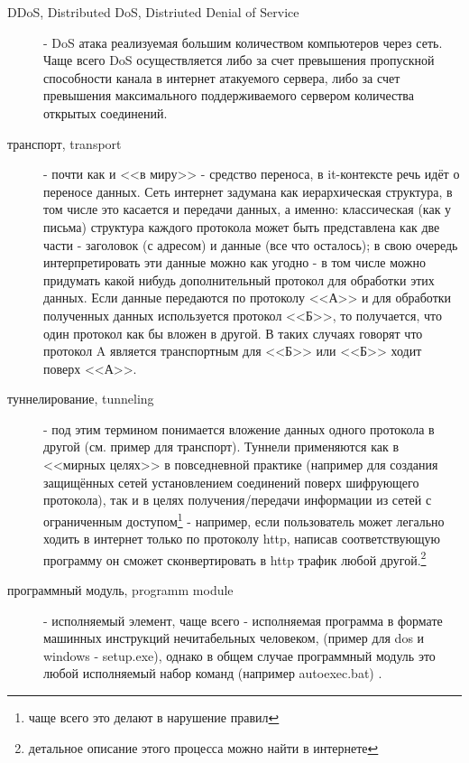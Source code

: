 \begin{description}
\item[DDoS, Distributed DoS, Distriuted Denial of Service]
 - DoS атака реализуемая
большим количеством
компьютеров через сеть. Чаще всего DoS осуществляется либо за счет превышения пропускной
способности канала в интернет атакуемого сервера, либо за счет превышения максимального
поддерживаемого сервером количества открытых соединений.

\item[транспорт, transport]
 - почти как и <<в миру>> - средство переноса, в it-контексте
речь идёт о переносе данных. Сеть интернет задумана как иерархическая
структура, в том числе это касается и передачи данных, а именно: классическая
(как у письма) структура каждого протокола
может быть представлена как две части - заголовок (с адресом) и данные
(все что осталось); в свою очередь интерпретировать эти данные можно как
угодно - в том числе можно придумать какой нибудь дополнительный протокол
для обработки этих данных. Если данные передаются по протоколу <<А>> и для
обработки полученных данных используется протокол <<Б>>, то
получается, что один протокол как бы вложен в другой. В таких случаях
говорят что протокол A является транспортным для <<Б>> или <<Б>> ходит
поверх <<А>>.

\item[туннелирование, tunneling]
 - под этим термином понимается вложение данных одного
протокола в другой (см. пример для транспорт). Туннели применяются как в
<<мирных целях>> в повседневной практике (например для создания защищённых
сетей установлением соединений поверх шифрующего протокола), так и в целях
получения/передачи информации из сетей с ограниченным доступом\footnote{чаще
всего это делают в нарушение правил} - например, если пользователь может
легально ходить в интернет только по протоколу http, написав соответствующую
программу он сможет сконвертировать в http трафик любой другой.\footnote{детальное
описание этого процесса можно найти в интернете}

\item[программный модуль, programm module]
 - исполняемый элемент, чаще всего - исполняемая
программа в формате машинных инструкций нечитабельных человеком, (пример
для dos и windows - setup.exe),  однако в общем случае программный модуль
это любой исполняемый набор команд (например autoexec.bat) .


\end{description}
